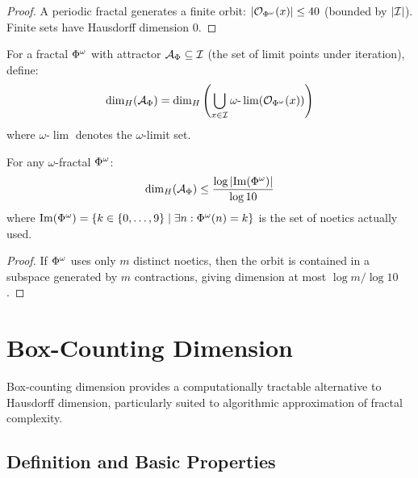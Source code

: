 \begin{proof}
A periodic fractal generates a finite orbit: $|\mathcal{O}_{\Phi^{\omega}}(x)| \leq 40$ (bounded by $|\mathcal{I}|$). Finite sets have Hausdorff dimension 0.
\end{proof}

\begin{definition}
\label{def:attractor-dimension}
For a fractal $\Phi^{\omega}$ with attractor $\mathcal{A}_\Phi \subseteq \mathcal{I}$ (the set of limit points under iteration), define:
\[
\dim_H(\mathcal{A}_\Phi) = \dim_H\left(\bigcup_{x \in \mathcal{I}} \omega\text{-}\lim(\mathcal{O}_{\Phi^{\omega}}(x))\right)
\]
where $\omega\text{-}\lim$ denotes the $\omega$-limit set.
\end{definition}

\begin{proposition}
\label{prop:attractor-dim-bound}
For any $\omega$-fractal $\Phi^{\omega}$:
\[
\dim_H(\mathcal{A}_\Phi) \leq \frac{\log |\mathrm{Im}(\Phi^{\omega})|}{\log 10}
\]
where $\mathrm{Im}(\Phi^{\omega}) = \{k \in \{0, \ldots, 9\} \mid \exists n : \Phi^{\omega}(n) = k\}$ is the set of noetics actually used.
\end{proposition}

\begin{proof}
If $\Phi^{\omega}$ uses only $m$ distinct noetics, then the orbit is contained in a subspace generated by $m$ contractions, giving dimension at most $\log m / \log 10$.
\end{proof}

\section{Box-Counting Dimension}
\label{sec:box-counting}

\begin{tcolorbox}[colback=blue!5!white,colframe=blue!75!black,title=\vnewthree]
Box-counting dimension provides a computationally tractable alternative to Hausdorff dimension, particularly suited to algorithmic approximation of fractal complexity.
\end{tcolorbox}

\subsection{Definition and Basic Properties}

